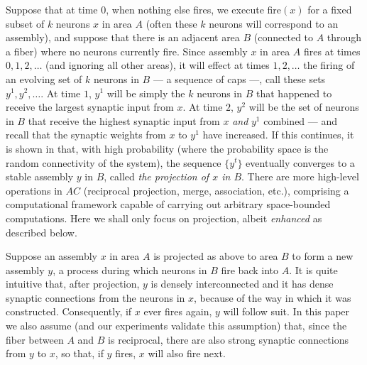 \documentclass[11pt,a4paper]{article}
\begin{document}
Suppose that at time $0$, when nothing else fires, we execute fire$(x)$ for a fixed subset of $k$ neurons $x$ in area $A$ (often these $k$ neurons will correspond to an assembly), and suppose that there is an adjacent area $B$ (connected to $A$ through a fiber) where no neurons currently fire.  Since assembly $x$ in area $A$ fires at times $0,1,2,\ldots$ (and ignoring all other areas), it will effect at times $1,2,\ldots$ the firing of an evolving set of $k$ neurons in $B$ --- a sequence of caps ---, call these sets $y^{1},y^{2},\ldots$.  At time $1$, $y^{1}$ will be simply the $k$ neurons in $B$ that happened to receive the largest synaptic input from $x$.  At time $2$, $y^{2}$ will be the set of neurons in $B$ that receive the highest synaptic input from $x$ {\em and} $y^1$ combined --- and recall that the synaptic weights from $x$ to $y^1$ have increased. If this continues, it is shown in \citet{PNAS} that, with high probability (where the probability space is the random connectivity of the system), the sequence $\{y^t\}$  eventually converges to a stable assembly $y$ in $B$, called {\em the projection of $x$ in $B$}. There are more high-level operations in $AC$ (reciprocal projection, merge, association, etc.), comprising a computational framework capable of carrying out arbitrary space-bounded computations. Here we shall only focus on projection, albeit {\em enhanced} as described below. 

Suppose an assembly $x$ in area $A$ is projected as above to area $B$ to form a new assembly $y$, a process during which neurons in $B$ fire back into $A$. It is quite intuitive that, after projection, $y$ is densely interconnected and it has dense synaptic connections from the neurons in $x$, because of the way in which it was constructed. Consequently, if $x$ ever fires again, $y$ will follow suit.  In this paper we also assume (and our experiments validate this assumption) that, since the fiber between $A$ and $B$ is reciprocal, there are also strong synaptic connections from $y$ to $x$, so that, if $y$ fires, $x$ will also fire next.

\end{document}

